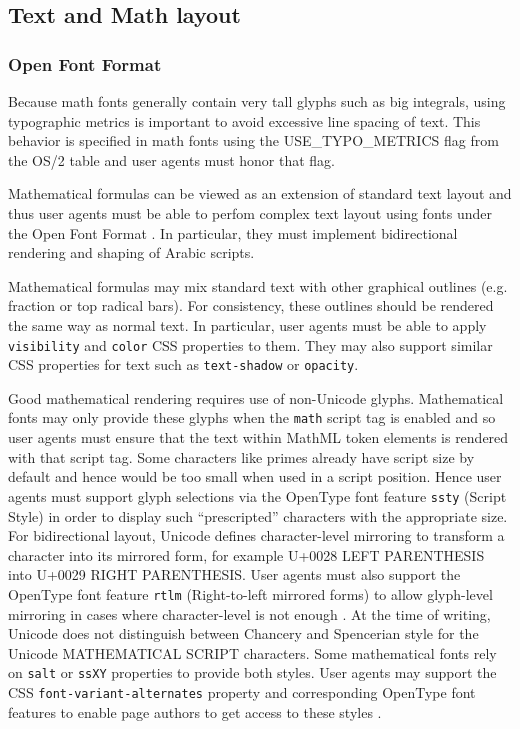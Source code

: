 \subsection{Text and Math layout}

\subsubsection{Open Font Format}

Because math fonts generally contain very tall glyphs such as big integrals,
using typographic metrics is important to avoid excessive line spacing of text.
This behavior is specified in math fonts using the USE\_TYPO\_METRICS flag from
the OS/2 table \cite{OpenFontFormat3} and user agents must honor that flag.

Mathematical formulas can be viewed as an extension of standard text layout
and thus user agents must be able to perfom
complex text layout \cite{CTL} using fonts under the Open Font Format
\cite{OpenFontFormat3}. In particular, they must implement bidirectional
rendering and shaping of Arabic scripts.

Mathematical formulas may mix standard text with other graphical outlines
(e.g. fraction or top radical bars). For consistency, these outlines should
be rendered the same way as normal text. In particular, user agents must be
able to apply {\tt visibility} and {\tt color} CSS properties to them. They may
also support similar CSS properties for text such as {\tt text-shadow} or
{\tt opacity}.

Good mathematical rendering requires use of non-Unicode glyphs. Mathematical
fonts may only provide these glyphs when the {\tt math}
script tag is enabled and so user agents must ensure that the text within
MathML token elements is rendered with that script tag. Some characters like
primes already have script size by default and hence would be too small when
used in a script position.
Hence user agents must support glyph selections via the OpenType font feature
{\tt ssty} (Script Style) in order to display such
``prescripted'' characters with the appropriate size.
For bidirectional layout, Unicode defines character-level mirroring
to transform a character into its mirrored form,
for example U+0028 LEFT PARENTHESIS into U+0029 RIGHT PARENTHESIS.
User agents must also support the OpenType font feature
{\tt rtlm} (Right-to-left mirrored forms)
to allow glyph-level mirroring in cases where character-level is not enough
\cite{OpenFontFormat3}.
At the time of writing, Unicode does not distinguish between Chancery and
Spencerian style for the Unicode MATHEMATICAL SCRIPT characters. Some
mathematical fonts rely on {\tt salt} or {\tt ssXY} properties to provide
both styles. User agents may support the CSS {\tt font-variant-alternates}
property and corresponding OpenType font features to enable page authors
to get access to these styles \cite{CSS3Font} \cite{OpenFontFormat3}.

